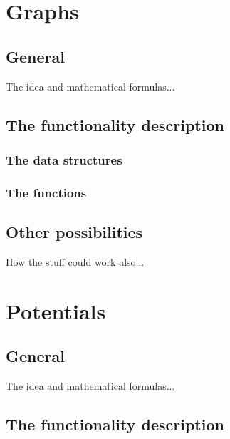 \documentclass[12pt,a4paper]{report}
\begin{document}
\newpage
\section{Graphs}
\subsection{General}

The idea and mathematical formulas...


\subsection{The functionality description}
\subsubsection{The data structures}

\subsubsection{The functions}


\subsection{Other possibilities}

How the stuff could work also...


\newpage
\section{Potentials}
\subsection{General}

The idea and mathematical formulas...


\subsection{The functionality description}
\end{document}
